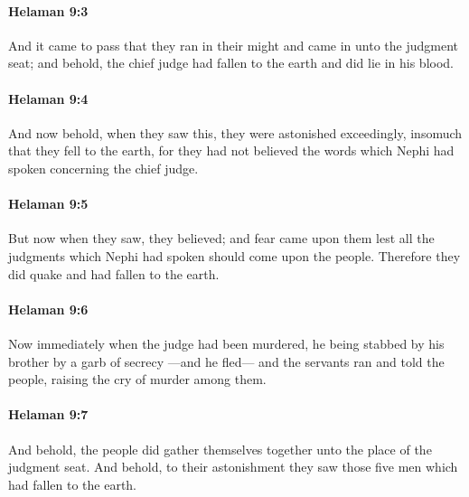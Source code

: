 		\paragraph{Helaman 9:3} %
			\label{HELAMAN-9-3}

			And it came to pass that they ran in their might
			and came in unto the judgment seat;
			and behold, the chief judge had fallen to the earth
			and did lie in his blood.

		\paragraph{Helaman 9:4} %
			\label{HELAMAN-9-4}

			And now behold, when they saw this,
			they were astonished exceedingly,
			insomuch that they fell to the earth,
			for they had not believed the words
			which Nephi had spoken concerning the chief judge.

		\paragraph{Helaman 9:5} %
			\label{HELAMAN-9-5}

			But now when they saw, they believed;
			and fear came upon them
			lest all the judgments which Nephi had spoken should come upon the people.
			Therefore they did quake and had fallen to the earth.

		\paragraph{Helaman 9:6} %
			\label{HELAMAN-9-6}

			Now immediately when the judge had been murdered,
			he being stabbed by his brother by a garb of secrecy
			---and he fled---
			and the servants ran and told the people,
			raising the cry of murder among them.

		\paragraph{Helaman 9:7} %
			\label{HELAMAN-9-7}

			And behold, the people did gather themselves together
			unto the place of the judgment seat.
			And behold, to their astonishment they saw those five men
			which had fallen to the earth.

